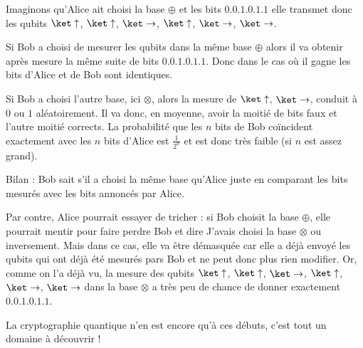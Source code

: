 \documentclass[11pt,class=report,crop=false]{standalone}
\begin{document}
Imaginons qu'Alice ait choisi la base $\oplus$ et les bits
$0.0.1.0.1.1$ elle transmet donc les qubits 
$\ket\uparrow$, $\ket\uparrow$, $\ket\rightarrow$, $\ket\uparrow$, $\ket\rightarrow$, $\ket\rightarrow$.

Si Bob a choisi de mesurer les qubits dans la même base $\oplus$ alors il va obtenir après mesure la même suite de bits $0.0.1.0.1.1$. Donc dans le cas où il gagne les bits d'Alice et de Bob sont identiques.

Si Bob a choisi l'autre base, ici $\otimes$, alors la mesure de $\ket\uparrow$, $\ket\rightarrow$, conduit à $0$ ou $1$ aléatoirement. Il va donc, en moyenne, avoir la moitié de bits faux et l'autre moitié corrects.  La probabilité que les $n$ bits de Bob coïncident exactement avec les $n$ bits d'Alice est $\frac{1}{2^n}$ et est donc très faible (si $n$ est assez grand).

Bilan : Bob sait s'il a choisi la même base qu'Alice juste en comparant les bits mesurés avec les bits annoncés par Alice. 


Par contre, Alice pourrait essayer de tricher : si Bob choisit la base $\oplus$, elle pourrait mentir pour faire perdre Bob et dire \og{}J'avais choisi la base $\otimes$\fg{} ou inversement.
Mais dans ce cas, elle va être démasquée car elle a déjà envoyé les qubits qui ont déjà été mesurés pars Bob et ne peut donc plus rien modifier.
Or, comme on l'a déjà vu, la mesure des qubits $\ket\uparrow$, $\ket\uparrow$, $\ket\rightarrow$, $\ket\uparrow$, $\ket\rightarrow$, $\ket\rightarrow$ dans la base $\otimes$ a très peu de chance de donner exactement $0.0.1.0.1.1$.

\bigskip

La cryptographie quantique n'en est encore qu'à ces débuts, c'est tout un domaine à découvrir !
\end{document}
